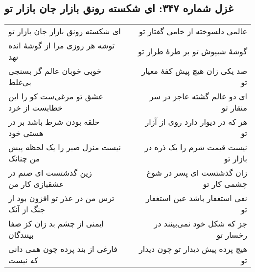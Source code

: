 \begin{center}
\section*{غزل شماره ۳۴۷: ای شکسته رونق بازار جان بازار تو}
\label{sec:347}
\begin{longtable}{l p{0.5cm} r}
ای شکسته رونق بازار جان بازار تو
&&
عالمی دلسوخته از خامی گفتار تو
\\
توشه هر روزی مرا از گوشهٔ انده نهد
&&
گوشهٔ شبپوش تو بر طرهٔ طرار تو
\\
خوبی خوبان عالم گر بسنجی بی‌غلط
&&
صد یکی زان هیچ پیش کفهٔ معیار تو
\\
عشق تو مرغی‌ست کو را این خطابست از خرد
&&
ای دو عالم گشته عاجز در سر منقار تو
\\
حلقه بودن شرط باشد بر در هستی خود
&&
هر که در دیوار دارد روی از آزار تو
\\
نیست منزل صبر را یک لحظه پیش من چنانک
&&
نیست قیمت شرم را یک ذره در بازار تو
\\
زین گذشتست ای صنم در عشقبازی کار من
&&
زان گذشتست ای پسر در شوخ چشمی کار تو
\\
ترس من در عذر تو افزون بود از جنگ از آنک
&&
نفی استغفار باشد عین استغفار تو
\\
ایمنی از چشم بد زان کز صفا بینندگان
&&
جز که شکل خود نمی‌بینند در رخسار تو
\\
فارغی از بند پرده چون همی دانی که نیست
&&
هیچ پرده پیش دیدار تو چون دیدار تو
\\
\end{longtable}
\end{center}
